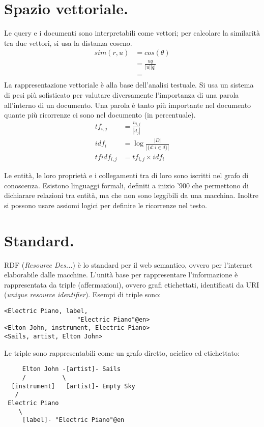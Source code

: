 \documentclass[11pt]{article}
\begin{document}
\begin{multicols}{2}
\section{Spazio vettoriale.}
Le query e i documenti sono interpretabili come vettori; per calcolare la similarità tra due vettori, si usa la distanza coseno.
\begin{align*}
  sim(r, u) &= cos(\theta) \\
            &= \frac{u q}{|u| |q|} \\
            &= \frac{}{}
  \end{align*}
La rappresentazione vettoriale è alla base dell'analisi testuale.
Si usa un sistema di pesi più sofisticato per valutare diversamente l'importanza di una parola all'interno di un documento.
Una parola è tanto più importante nel documento quante più ricorrenze ci sono nel documento (in percentuale).
\begin{align*}
  tf_{i, j} &= \frac{n_{i,j}}{|d_j|} \\
  idf_i &= \log{\frac{|D|}{|\{d : i \in d\}|}} \\
  tfidf_{i, j} &= tf_{i, j} \times idf_i
\end{align*}

Le entità, le loro proprietà e i collegamenti tra di loro sono iscritti nel grafo di conoscenza.
Esistono linguaggi formali, definiti a inizio '900 che permettono di dichiarare relazioni tra entità, ma che non sono leggibili da una macchina.
Inoltre si possono usare assiomi logici per definire le ricorrenze nel testo.


\section{Standard.}
RDF (\textit{Resource Des...}) è lo standard per il web semantico, ovvero per l'internet elaborabile dalle macchine.
L'unità base per rappresentare l'informazione è rappresentata da triple (affermazioni), ovvero grafi etichettati, identificati da URI (\textit{unique resource identifier}).
Esempi di triple sono:
\begin{verbatim}
<Electric Piano, label,
                    "Electric Piano"@en>
<Elton John, instrument, Electric Piano>
<Sails, artist, Elton John>
\end{verbatim}
Le triple sono rappresentabili come un grafo diretto, aciclico ed etichettato:
\begin{verbatim}
     Elton John -[artist]- Sails
     /          \
  [instrument]   [artist]- Empty Sky
   /
 Electric Piano 
    \
     [label]- "Electric Piano"@en
\end{verbatim}


\end{multicols}
\end{document}
